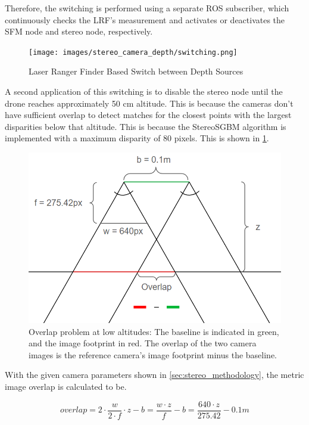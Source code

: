 Therefore, the switching is performed using a separate ROS subscriber, which continuously checks the LRF's measurement and activates or deactivates the SFM node and stereo node, respectively.

\begin{figure}[h]
    \centering
    \texttt{[image: images/stereo\_camera\_depth/switching.png]}
    \caption{Laser Ranger Finder Based Switch between Depth Sources}
\end{figure}

A second application of this switching is to disable the stereo node until the drone reaches approximately 50 cm altitude. This is because the cameras don't have sufficient overlap to detect matches for the closest points with the largest disparities below that altitude. This is because the StereoSGBM algorithm is implemented with a maximum disparity of 80 pixels. This is shown in \cref{fig:overlap}.

\begin{figure}[h]
    \centering
    \includegraphics[scale=0.17]{images/stereo_camera_depth/overlap.png}
    \caption{Overlap problem at low altitudes: The baseline is indicated in green, and the image footprint in red. The overlap of the two camera images is the reference camera's image footprint minus the baseline.}
    \label{fig:overlap}
\end{figure}

With the given camera parameters shown in \cref{sec:stereo_methodology}, the metric image overlap is calculated to be.

\begin{equation}
    overlap = 2 \cdot \frac{w}{2\cdot f} \cdot z - b = \frac{w\cdot z}{f} - b = \frac{640\cdot z}{275.42} - 0.1 m
    \label{eq:overlap}
\end{equation}

